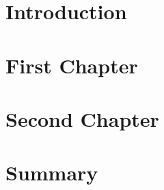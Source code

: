 \chapter{Introduction}\label{chapter:introduction}


\chapter{First Chapter}\label{chapter:first_chapter}


\chapter{Second Chapter}\label{chapter:second_chapter}


\chapter{Summary}\label{chapter:summary} 

